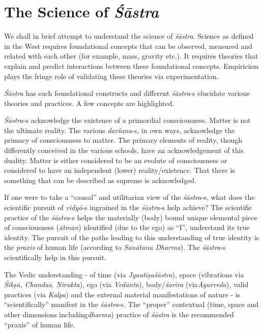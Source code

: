 \section*{The Science of \textit{Śāstra}}

We shall in brief attempt to understand the science of \textit{śāstra}. Science as defined in the West requires foundational concepts that can be observed, measured and related with each other (for example, mass, gravity etc.). It requires theories that explain and predict interactions between these foundational concepts. Empiricism plays the fringe role of validating these theories via experimentation.

\textit{Śāstra} has such foundational constructs and different \textit{śāstra}-s elucidate various theories and practices. A few concepts are highlighted.

\textit{Śāstra}-s acknowledge the existence of a primordial consciousness. Matter is not the ultimate reality. The various \textit{darśana}-s, in own ways, acknowledge the primacy of consciousness to matter. The primary elements of reality, though differently conceived in the various schools, have an acknowledgement of this duality. Matter is either considered to be an evolute of consciousness or considered to have an independent (lower) reality/existence. That there is something that can be described as supreme is acknowledged.

If one were to take a “causal” and utilitarian view of the \hbox{\textit{śāstra}-s}, what does the scientific pursuit of \textit{vidyā}-s ingrained in the \hbox{\textit{śāstra}-s} help achieve? The scientific practice of the \textit{śāstra}-s helps the materially (body) bound unique elemental piece of consciousness (\textit{ātman}) identified (due to the ego) as “I”, understand its true identity. The pursuit of the paths leading to this understanding of true identity is the \textit{praxis} of human life (according to \textit{Sanātana Dharma}). The \textit{śāstra}-s scientifically help in this pursuit. 

The Vedic understanding - of time (via \textit{Jyautiṣaśāstra}), space (vibrations via \textit{Śikṣā, Chandas, Nirukta}), ego (via \textit{Vedānta}), body/\textit{śarīra} (via\break \textit{Āyurveda}), valid practices (via \textit{Kalpa}) and the external material manifestations of nature - is “scientifically” manifest in the \textit{śāstra}-s. The “proper” contextual (time, space and other dimensions including\break \textit{dharma}) practice of \textit{śāstra} is the recommended “praxis” of human life.

